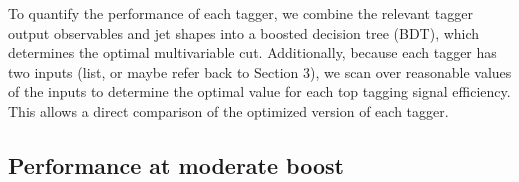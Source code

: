 To quantify the performance of each tagger, we combine the relevant tagger output observables and jet shapes into a boosted decision tree (BDT), which determines the optimal multivariable cut. Additionally, because each tagger has two inputs (list, or maybe refer back to Section 3), we scan over reasonable values of the inputs to determine the optimal value for each top tagging signal efficiency. This allows  a direct comparison of the optimized version of each tagger. 

\subsection{Performance at moderate boost}

\begin{figure}
\begin{center}

\end{center}
\end{figure}
